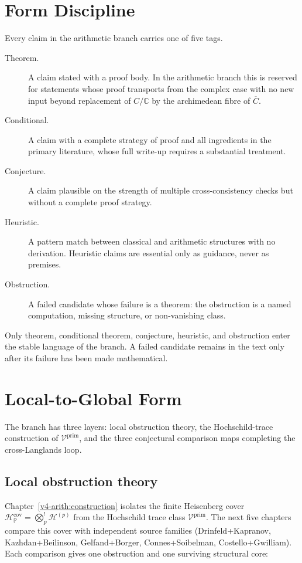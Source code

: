 \section{Form Discipline}
\label{v4-arith:manifesto:form}

Every claim in the arithmetic branch carries one of five tags.

\begin{description}
\item[Theorem.] A claim stated with a proof body. In the
arithmetic branch this is reserved for statements whose proof
transports from the complex case with no new input beyond
replacement of \(C/\mathbb{C}\) by the archimedean fibre of
\(\overline{C}\).
\item[Conditional.] A claim with a complete strategy of proof
and all ingredients in the primary literature, whose full write-up
requires a substantial treatment.
\item[Conjecture.] A claim plausible on the strength of multiple
cross-consistency checks but without a complete proof strategy.
\item[Heuristic.] A pattern match between classical and arithmetic
structures with no derivation. Heuristic claims are essential
only as guidance, never as premises.
\item[Obstruction.] A failed candidate whose failure is a theorem:
the obstruction is a named computation, missing structure, or
non-vanishing class.
\end{description}

Only theorem, conditional theorem, conjecture, heuristic, and
obstruction enter the stable language of the branch. A failed
candidate remains in the text only after its failure has been made
mathematical.

\section{Local-to-Global Form}
\label{v4-arith:manifesto:shape}

The branch has three layers: local obstruction theory, the
Hochschild-trace construction of \(\mathcal{V}^{\mathrm{prim}}\), and
the three conjectural comparison maps completing the
cross-Langlands loop.

\subsection*{Local obstruction theory}

Chapter~\ref{v4-arith:construction} isolates the finite Heisenberg
cover
\(\mathcal{H}^{\mathrm{cov}}_{\mathbb P}=\bigotimes^{!}_{p}\mathcal{H}^{(p)}\)
from the Hochschild trace class \(\mathcal{V}^{\mathrm{prim}}\).
The next five chapters compare this cover with independent
source families
(Drinfeld+Kapranov, Kazhdan+Beilinson, Gelfand+Borger,
Connes+Soibelman, Costello+Gwilliam). Each comparison gives one
obstruction and one surviving structural core:

